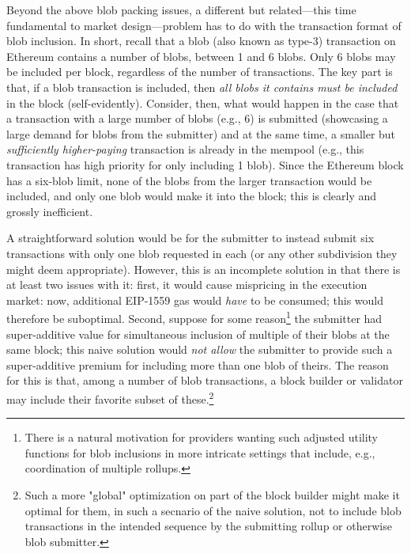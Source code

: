 Beyond the above blob packing issues, a different but related---this time fundamental to market design---problem has to do with the transaction format of blob inclusion.
In short, recall that a blob (also known as type-3) transaction on Ethereum contains a number of blobs, between 1 and 6 blobs. Only 6 blobs may be included per block, regardless of the number of transactions.
The key part is that, if a blob transaction is included, then \emph{all blobs it contains must be included} in the block (self-evidently).
Consider, then, what would happen in the case that a transaction with a large number of blobs (e.g., 6) is submitted (showcasing a large demand for blobs from the submitter) and at the same time, a smaller but \emph{sufficiently higher-paying} transaction is already in the mempool (e.g., this transaction has high priority for only including 1 blob). Since the Ethereum block has a six-blob limit, none of the blobs from the larger transaction would be included, and only one blob would make it into the block; this is clearly and grossly inefficient.



A straightforward solution would be for the submitter to instead submit six transactions with only one blob requested in each (or any other subdivision they might deem appropriate).
However, this is an incomplete solution in that there is at least two issues with it: first, it would cause mispricing in the execution market: now, additional EIP-1559 gas would \emph{have} to be consumed; this would therefore be suboptimal.
Second, suppose for some reason\footnote{There is a natural motivation for providers wanting such adjusted utility functions for blob inclusions in more intricate settings that include, e.g., coordination of multiple rollups.} the submitter had super-additive value for simultaneous inclusion of multiple of their blobs at the same block; this naive solution would \emph{not allow} the submitter to provide such a super-additive premium for including more than one blob of theirs.
The reason for this is that, among a number of blob transactions, a block builder or validator may include their favorite subset of these.\footnote{Such a more "global" optimization on part of the block builder might make it optimal for them, in such a secnario of the naive solution, not to include blob transactions in the intended sequence by the submitting rollup or otherwise blob submitter.}



